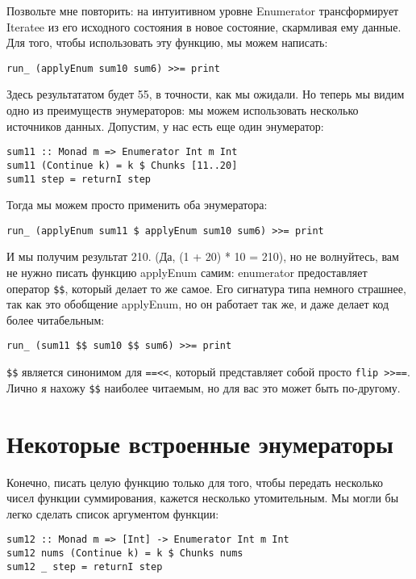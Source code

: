 Позвольте мне повторить: на интуитивном уровне Enumerator трансформирует Iteratee из его исходного состояния в новое состояние, скармливая ему данные. Для того, чтобы использовать эту функцию, мы можем написать:

\begin{lstlisting}
run_ (applyEnum sum10 sum6) >>= print
\end{lstlisting}

Здесь результататом будет 55, в точности, как мы ожидали. Но теперь мы видим одно из преимуществ энумераторов: мы можем использовать несколько источников данных. Допустим, у нас есть еще один энумератор:

\begin{lstlisting}
sum11 :: Monad m => Enumerator Int m Int
sum11 (Continue k) = k $ Chunks [11..20]
sum11 step = returnI step
\end{lstlisting}%

Тогда мы можем просто применить оба энумератора:

\begin{lstlisting}
run_ (applyEnum sum11 $ applyEnum sum10 sum6) >>= print
\end{lstlisting}%

И мы получим результат 210. (Да, (1 + 20) * 10 = 210), но не волнуйтесь, вам не нужно писать функцию applyEnum самим: enumerator предоставляет оператор \lstinline'$$', который делает то же самое. Его сигнатура типа немного страшнее, так как это обобщение applyEnum, но он работает так же, и даже делает код более читабельным:

\begin{lstlisting}
run_ (sum11 $$ sum10 $$ sum6) >>= print
\end{lstlisting}%

\lstinline'$$' является синонимом для \lstinline'==<<', который представляет собой просто \lstinline'flip >>=='. Лично я нахожу \lstinline'$$' наиболее читаемым, но для вас это может быть по-другому.

\section{Некоторые встроенные энумераторы}

Конечно, писать целую функцию только для того, чтобы передать несколько чисел функции суммирования, кажется несколько утомительным. Мы могли бы легко сделать список аргументом функции:

\begin{lstlisting}
sum12 :: Monad m => [Int] -> Enumerator Int m Int
sum12 nums (Continue k) = k $ Chunks nums
sum12 _ step = returnI step
\end{lstlisting}%

